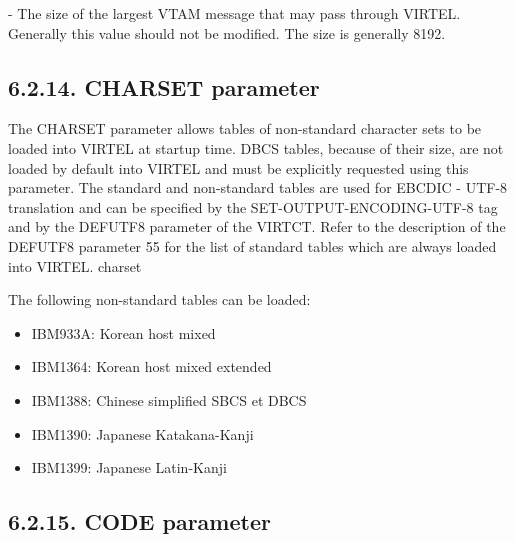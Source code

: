 \documentclass[letterpaper,10pt,english]{sphinxmanual}
\begin{document}
 - The size of the largest VTAM message that may pass through VIRTEL. Generally this value should not be modified. The size is generally 8192.


\subsection{6.2.14. CHARSET parameter}
\label{\detokenize{Installation_Guide:charset-parameter}}
\begin{sphinxVerbatim}[commandchars=\\\{\}]
 
\end{sphinxVerbatim}

The CHARSET parameter allows tables of non-standard character sets to be loaded into VIRTEL at startup time. DBCS tables, because of their size, are not loaded by default into VIRTEL and must be explicitly requested using this parameter. The standard and non-standard tables are used for EBCDIC - UTF-8 translation and can be specified by the SET-OUTPUT-ENCODING-UTF-8 tag and by the DEFUTF8 parameter of the VIRTCT. Refer to the description of the DEFUTF8 parameter 55 for the list of standard tables which are always loaded into VIRTEL.
charset

The following non-standard tables can be loaded:
\begin{itemize}
\item {} 
IBM933A: Korean host mixed

\item {} 
IBM1364: Korean host mixed extended

\item {} 
IBM1388: Chinese simplified SBCS et DBCS

\item {} 
IBM1390: Japanese Katakana-Kanji

\item {} 
IBM1399: Japanese Latin-Kanji

\end{itemize}


\subsection{6.2.15. CODE parameter}
\label{\detokenize{Installation_Guide:code-parameter}}
\begin{sphinxVerbatim}[commandchars=\\\{\}]
 
\end{sphinxVerbatim}
\end{document}
